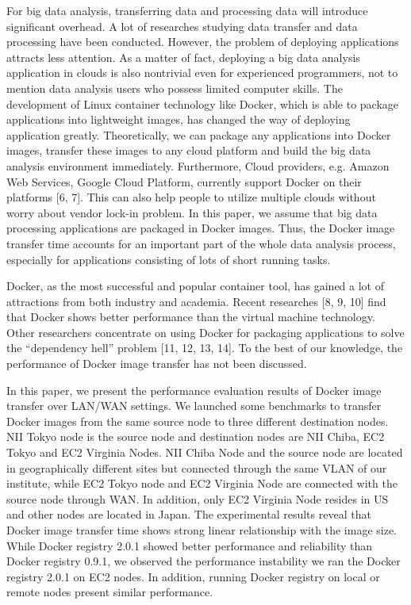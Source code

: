 \documentclass{ieicej}
\begin{document}
For big data analysis, transferring data and processing data will introduce significant overhead. A lot of researches studying data transfer and data processing have been conducted. However, the problem of deploying applications attracts less attention. As a matter of fact, deploying a big data analysis application in clouds is also nontrivial even for experienced programmers, not to mention data analysis users who possess limited computer skills. The development of Linux container technology like Docker, which is able to package applications into lightweight images, has changed the way of deploying application greatly. Theoretically, we can package any applications into Docker images, transfer these images to any cloud platform and build the big data analysis environment immediately. Furthermore, Cloud providers, e.g. Amazon Web Services, Google Cloud Platform, currently support Docker on their platforms [6, 7]. This can also help people to utilize multiple clouds without worry about vendor lock-in problem. In this paper, we assume that big data processing applications are packaged in Docker images. Thus, the Docker image transfer time accounts for an important part of the whole data analysis process, especially for applications consisting of lots of short running tasks.


Docker, as the most successful and popular container tool, has gained a lot of attractions from both industry and academia. Recent researches [8, 9, 10] find that Docker shows better performance than the virtual machine technology. Other researchers concentrate on using Docker for packaging applications to solve the ``dependency hell'' problem [11, 12, 13, 14]. To the best of our knowledge, the performance of Docker image transfer has not been discussed.

In this paper, we present the performance evaluation results of Docker image transfer over LAN/WAN settings. We launched some benchmarks to transfer Docker images from the same source node to three different destination nodes. NII Tokyo node is the source node and destination nodes are NII Chiba, EC2 Tokyo and EC2 Virginia Nodes. NII Chiba Node and the source node are located in geographically different sites but connected through the same VLAN of our institute, while EC2 Tokyo node and EC2 Virginia Node are connected with the source node through WAN. In addition, only EC2 Virginia Node resides in US and other nodes are located in Japan. The experimental results reveal that Docker image transfer time shows strong linear relationship with the image size. While Docker registry 2.0.1 showed better performance and reliability than Docker registry 0.9.1, we observed the performance instability we ran the Docker registry 2.0.1 on EC2 nodes. In addition, running Docker registry on local or remote nodes present similar performance.
\end{document}
